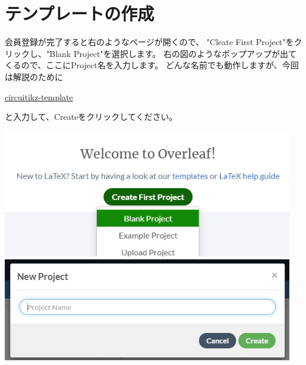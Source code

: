 	\section{テンプレートの作成}
		\noindent
		\begin{minipage}{0.4\hsize}%
			会員登録が完了すると右のようなページが開くので、
			"Cleate First Project"をクリックし、"Blank Project"を選択します。
			右の図のようなポップアップが出てくるので、ここにProject名を入力します。
			どんな名前でも動作しますが、今回は解説のために
			\begin{mdframed}[style=shadow]
				\url{circuitikz-template}
			\end{mdframed}\vspace{-3mm}
			と入力して、Createをクリックしてください。
		\end{minipage}\hfill
		\begin{minipage}{0.6\hsize}
			\begin{flushright}
				\includegraphics[width=0.95\textwidth]{overleaf-page-createproject.png}\\
				\vspace{3mm}
				\includegraphics[width=0.95\textwidth]{overleaf-page-projectname.png}
			\end{flushright}
		\end{minipage}
		
